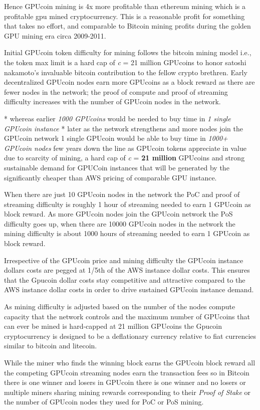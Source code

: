 Hence GPUcoin mining is 4x more profitable than ethereum mining which is a profitable gpu mined cryptocurrency. This is a reasonable profit for something that takes no effort, and comparable to Bitcoin mining profits during the golden GPU mining era circa 2009-2011.

Initial GPUcoin token difficulty for mining follows the bitcoin mining model i.e., the token max limit is a hard cap of \emph{c} = 21 million GPUcoins to honor satoshi nakamoto’s invaluable bitcoin contribution to the fellow crypto brethren. Early decentralized GPUcoin nodes earn more GPUcoins as a block reward as there are fewer nodes in the network; the proof of compute and proof of streaming difficulty increases with the number of GPUcoin nodes in the network.

* whereas earlier \emph{1000 GPUcoins} would be needed to buy time in \emph{1 single GPUcoin instance}
* later as the network strengthens and more nodes join the GPUcoin network 1 single GPUcoin would be able to buy time in \emph{1000+ GPUcoin nodes} few years down the line as GPUcoin tokens appreciate in value due to scarcity of mining, a hard cap of \emph{c} = \textbf{21 million} GPUcoins and strong sustainable demand for GPUCoin instances that will be generated by the significantly cheaper than AWS pricing of comparable GPU instance.

When there are just 10 GPUcoin nodes in the network the PoC and proof of streaming difficulty is roughly 1 hour of streaming needed to earn 1 GPUcoin as block reward. As more GPUcoin nodes join the GPUcoin network the PoS difficulty goes up, when there are 10000 GPUcoin nodes in the network the mining difficulty is about 1000 hours of streaming needed to earn 1 GPUcoin as block reward.

Irrespective of the GPUcoin price and mining difficulty the GPUcoin instance dollars costs are pegged at 1/5th of the AWS instance dollar costs. This ensures that the Gpucoin dollar costs stay competitive and attractive compared to the AWS instance dollar costs in order to drive sustained GPUcoin instance demand.

As mining difficulty is adjusted based on the number of the nodes compute capacity that the network controls and the maximum number of GPUcoins that can ever be mined is hard-capped at 21 million GPUcoins the Gpucoin cryptocurrency is designed to be a deflationary currency relative to fiat currencies similar to bitcoin and litecoin.

While the miner who finds the winning block earns the GPUcoin block reward all the competing GPUcoin streaming nodes earn the transaction fees so in Bitcoin there is one winner and losers in GPUcoin there is one winner and no losers or multiple miners sharing mining rewards corresponding to their \emph{Proof of Stake} or the number of GPUcoin nodes they used for PoC or PoS mining.
